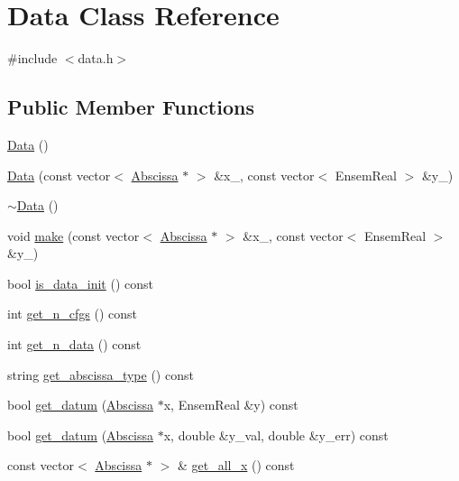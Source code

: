 \hypertarget{classData}{}\section{Data Class Reference}
\label{classData}


{\ttfamily \#include $<$data.\+h$>$}

\subsection*{Public Member Functions}
\begin{DoxyCompactItemize}
\item 
\mbox{\hyperlink{classData_af11f741cb7f587e2e495452a8905a22a}{Data}} ()
\item 
\mbox{\hyperlink{classData_a9f1ea96cc98b80ed3778ff5818cb91f8}{Data}} (const vector$<$ \mbox{\hyperlink{classAbscissa}{Abscissa}} $\ast$ $>$ \&x\+\_\+, const vector$<$ Ensem\+Real $>$ \&y\+\_\+)
\item 
\mbox{\hyperlink{classData_aab31956423290f0d62dcca47ab4d16dd}{$\sim$\+Data}} ()
\item 
void \mbox{\hyperlink{classData_acf9b4e6e52730e9da47d82bda61ac1ca}{make}} (const vector$<$ \mbox{\hyperlink{classAbscissa}{Abscissa}} $\ast$ $>$ \&x\+\_\+, const vector$<$ Ensem\+Real $>$ \&y\+\_\+)
\item 
bool \mbox{\hyperlink{classData_a804a4d59e6211aa54a629b31ad66cbd4}{is\+\_\+data\+\_\+init}} () const
\item 
int \mbox{\hyperlink{classData_a1ac2adcf6c6717759f820eceed4b55e4}{get\+\_\+n\+\_\+cfgs}} () const
\item 
int \mbox{\hyperlink{classData_a1ec16adf40ee062d8d75b33acfe156d5}{get\+\_\+n\+\_\+data}} () const
\item 
string \mbox{\hyperlink{classData_aeb6b453e589d11d200e711fbd7501e8f}{get\+\_\+abscissa\+\_\+type}} () const
\item 
bool \mbox{\hyperlink{classData_ad7e50542712441af6ad2a227193a777f}{get\+\_\+datum}} (\mbox{\hyperlink{classAbscissa}{Abscissa}} $\ast$x, Ensem\+Real \&y) const
\item 
bool \mbox{\hyperlink{classData_aab2d2ba01acb88ede5beb3ab54053d73}{get\+\_\+datum}} (\mbox{\hyperlink{classAbscissa}{Abscissa}} $\ast$x, double \&y\+\_\+val, double \&y\+\_\+err) const
\item 
const vector$<$ \mbox{\hyperlink{classAbscissa}{Abscissa}} $\ast$ $>$ \& \mbox{\hyperlink{classData_a79204577812567531adde90797885b3e}{get\+\_\+all\+\_\+x}} () const

\end{DoxyCompactItemize}
